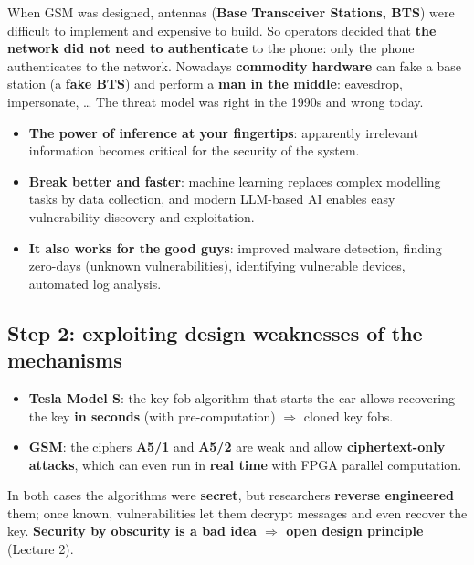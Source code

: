 \begin{exbox}[title={Unforeseen capabilities: unilateral authentication in GSM}]
When GSM was designed, antennas (\textbf{Base Transceiver Stations, BTS}) were difficult to
implement and expensive to build. So operators decided that \textbf{the network did not need to
authenticate} to the phone: only the phone authenticates to the network. Nowadays
\textbf{commodity hardware} can fake a base station (a \textbf{fake BTS}) and perform a
\textbf{man in the middle}: eavesdrop, impersonate, \ldots{} The threat model was right in the
1990s and wrong today.
\end{exbox}

\begin{exbox}[title={Unforeseen computational/algorithmic capabilities: the ML and AI revolution}]
\begin{itemize}
  \item \textbf{The power of inference at your fingertips}: apparently irrelevant information
        becomes critical for the security of the system.
  \item \textbf{Break better and faster}: machine learning replaces complex modelling tasks by
        data collection, and modern LLM-based AI enables easy vulnerability discovery and
        exploitation.
  \item \textbf{It also works for the good guys}: improved malware detection, finding zero-days
        (unknown vulnerabilities), identifying vulnerable devices, automated log analysis.
\end{itemize}
\end{exbox}

\subsection{Step 2: exploiting design weaknesses of the mechanisms}

\begin{exbox}[title={Weak cryptographic primitives}]
\begin{itemize}
  \item \textbf{Tesla Model S}: the key fob algorithm that starts the car allows recovering the
        key \textbf{in seconds} (with pre-computation) $\Rightarrow$ cloned key fobs.
  \item \textbf{GSM}: the ciphers \textbf{A5/1} and \textbf{A5/2} are weak and allow
        \textbf{ciphertext-only attacks}, which can even run in \textbf{real time} with FPGA
        parallel computation.
\end{itemize}
In both cases the algorithms were \textbf{secret}, but researchers \textbf{reverse engineered}
them; once known, vulnerabilities let them decrypt messages and even recover the key.
\textbf{Security by obscurity is a bad idea $\Rightarrow$ open design principle} (Lecture 2).
\end{exbox}

